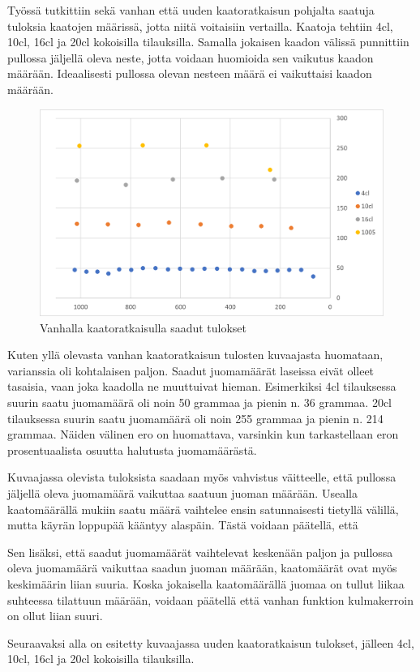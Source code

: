 Työssä tutkittiin sekä vanhan että uuden kaatoratkaisun pohjalta saatuja tuloksia kaatojen määrissä, jotta niitä voitaisiin vertailla. Kaatoja tehtiin 4cl, 10cl, 16cl ja 20cl kokoisilla tilauksilla. Samalla jokaisen kaadon välissä punnittiin pullossa jäljellä oleva neste, jotta voidaan huomioida sen vaikutus kaadon määrään. Ideaalisesti pullossa olevan nesteen määrä ei vaikuttaisi kaadon määrään.

\begin{figure}[h]
\begin{center}
\includegraphics[scale=0.6]{img/kaadot_vanha_kesken.png}
\end{center}
\caption{Vanhalla kaatoratkaisulla saadut tulokset}
\label{fig:kaadot_vanha}
\end{figure}

Kuten yllä olevasta vanhan kaatoratkaisun tulosten kuvaajasta huomataan, varianssia oli kohtalaisen paljon. Saadut juomamäärät laseissa eivät olleet tasaisia, vaan joka kaadolla ne muuttuivat hieman. Esimerkiksi 4cl tilauksessa suurin saatu juomamäärä oli noin 50 grammaa ja pienin n. 36 grammaa. 20cl tilauksessa suurin saatu juomamäärä oli noin 255 grammaa ja pienin n. 214 grammaa. Näiden välinen ero on huomattava, varsinkin kun tarkastellaan eron prosentuaalista osuutta halutusta juomamäärästä.

Kuvaajassa olevista tuloksista saadaan myös vahvistus väitteelle, että pullossa jäljellä oleva juomamäärä vaikuttaa saatuun juoman määrään. Usealla kaatomäärällä mukiin saatu määrä vaihtelee ensin satunnaisesti tietyllä välillä, mutta käyrän loppupää kääntyy alaspäin. Tästä voidaan päätellä, että

Sen lisäksi, että saadut juomamäärät vaihtelevat keskenään paljon ja pullossa oleva juomamäärä vaikuttaa saadun juoman määrään, kaatomäärät ovat myös keskimäärin liian suuria. Koska jokaisella kaatomäärällä juomaa on tullut liikaa suhteessa tilattuun määrään, voidaan päätellä että vanhan funktion kulmakerroin on ollut liian suuri.

Seuraavaksi alla on esitetty kuvaajassa uuden kaatoratkaisun tulokset, jälleen 4cl, 10cl, 16cl ja 20cl kokoisilla tilauksilla.
